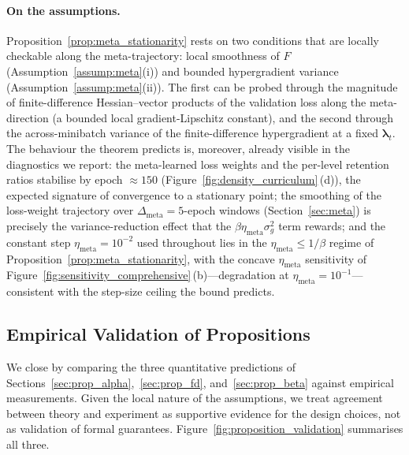 \documentclass[10pt]{article}
\theoremstyle{plain}
\theoremstyle{definition}
\begin{document}
\paragraph{On the assumptions.} Proposition~\ref{prop:meta_stationarity} rests on two conditions that are locally checkable along the meta-trajectory: local smoothness of $F$ (Assumption~\ref{assump:meta}(i)) and bounded hypergradient variance (Assumption~\ref{assump:meta}(ii)). The first can be probed through the magnitude of finite-difference Hessian--vector products of the validation loss along the meta-direction (a bounded local gradient-Lipschitz constant), and the second through the across-minibatch variance of the finite-difference hypergradient at a fixed $\boldsymbol{\lambda}_t$. The behaviour the theorem predicts is, moreover, already visible in the diagnostics we report: the meta-learned loss weights and the per-level retention ratios stabilise by epoch $\approx\!150$ (Figure~\ref{fig:density_curriculum}\,(d)), the expected signature of convergence to a stationary point; the smoothing of the loss-weight trajectory over $\Delta_{\mathrm{meta}}\!=\!5$-epoch windows (Section~\ref{sec:meta}) is precisely the variance-reduction effect that the $\beta\eta_{\mathrm{meta}}\sigma_g^{2}$ term rewards; and the constant step $\eta_{\mathrm{meta}}\!=\!10^{-2}$ used throughout lies in the $\eta_{\mathrm{meta}}\!\le\!1/\beta$ regime of Proposition~\ref{prop:meta_stationarity}, with the concave $\eta_{\mathrm{meta}}$ sensitivity of Figure~\ref{fig:sensitivity_comprehensive}\,(b)---degradation at $\eta_{\mathrm{meta}}\!=\!10^{-1}$---consistent with the step-size ceiling the bound predicts.

\subsection{Empirical Validation of Propositions}
\label{sec:theory_empirical}

We close by comparing the three quantitative predictions of Sections~\ref{sec:prop_alpha},~\ref{sec:prop_fd}, and~\ref{sec:prop_beta} against empirical measurements. Given the local nature of the assumptions, we treat agreement between theory and experiment as supportive evidence for the design choices, not as validation of formal guarantees. Figure~\ref{fig:proposition_validation} summarises all three.
\end{document}
